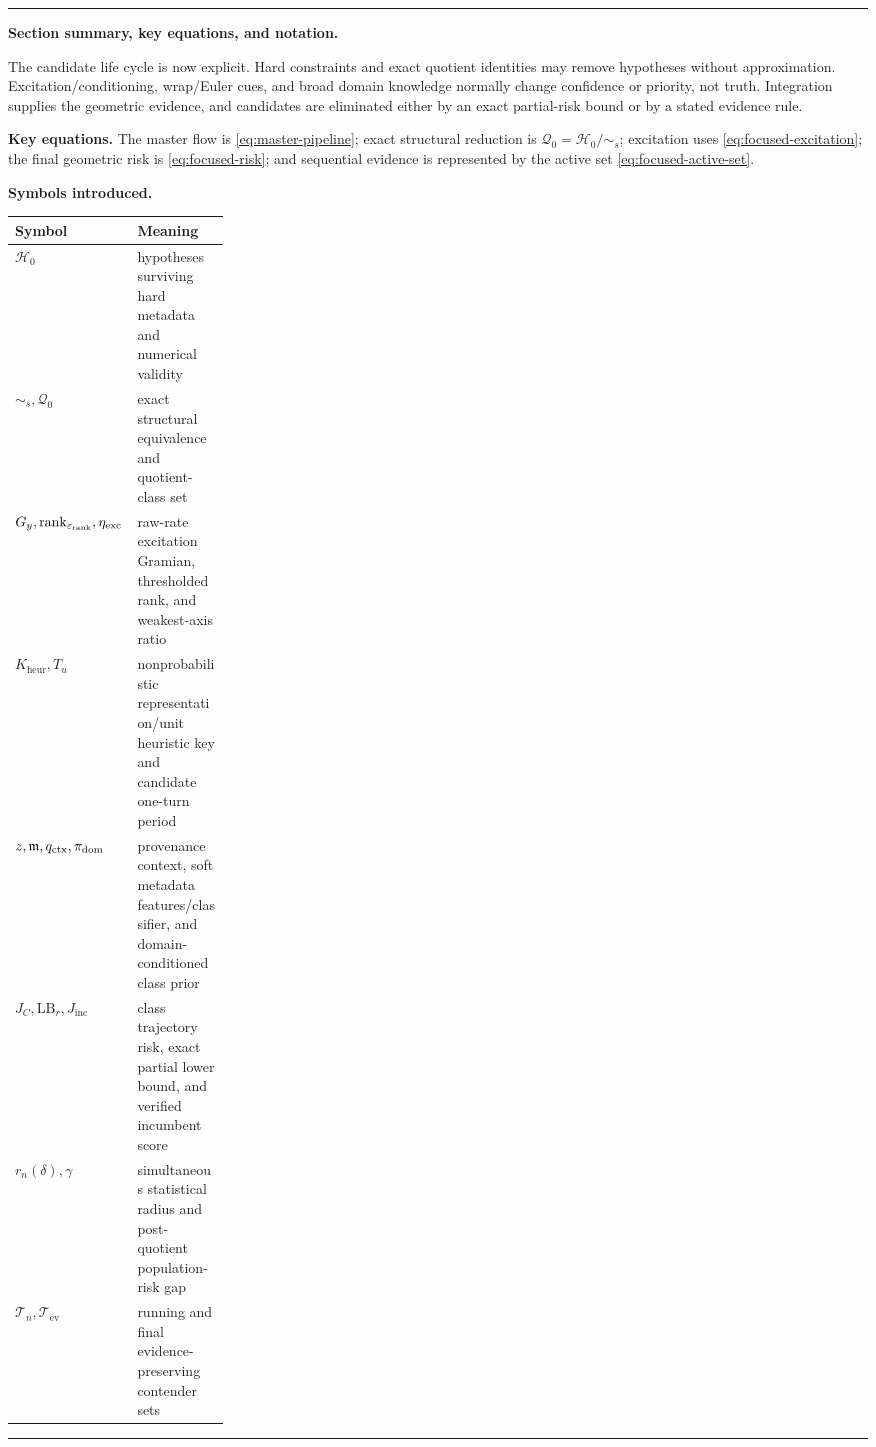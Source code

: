 \documentclass[11pt]{article}
\newenvironment{sectionrecap}
{\par\medskip\begingroup\small\noindent\rule{\linewidth}{0.4pt}\par
\smallskip\noindent\textbf{Section summary, key equations, and notation.}\par\smallskip}
{\par\smallskip\noindent\rule{\linewidth}{0.4pt}\par\endgroup\medskip}
\begin{document}
    \begin{sectionrecap}
        The candidate life cycle is now explicit. Hard constraints and exact quotient identities
        may remove hypotheses without approximation. Excitation/conditioning, wrap/Euler cues, and broad
        domain knowledge normally change confidence or priority, not truth. Integration supplies
        the geometric evidence, and candidates are eliminated either by an exact partial-risk
        bound or by a stated evidence rule.

        \noindent\textbf{Key equations.}
        The master flow is \eqref{eq:master-pipeline}; exact structural reduction is
        $\mathcal Q_0=\mathcal H_0/\!\sim_s$; excitation uses
        \eqref{eq:focused-excitation}; the final geometric risk is \eqref{eq:focused-risk}; and
        sequential evidence is represented by the active set \eqref{eq:focused-active-set}.

        \noindent\textbf{Symbols introduced.}
        \begin{center}
            \small
            \begin{tabularx}{0.97\linewidth}{@{}p{0.25\linewidth}Y@{}}
\toprule
Symbol & Meaning \\
\midrule
$\mathcal H_0$ & hypotheses surviving hard metadata and numerical validity \\
$\sim_s,\mathcal Q_0$ & exact structural equivalence and quotient-class set \\
$G_y,\operatorname{rank}_{\varepsilon_{\rm rank}},\eta_{\rm exc}$ & raw-rate excitation Gramian, thresholded rank, and weakest-axis ratio \\
$K_{\mathrm{heur}},T_u$ & nonprobabilistic representation/unit heuristic key and candidate one-turn period \\
$z,\mathfrak m,q_{\rm ctx},\pi_{\mathrm{dom}}$ & provenance context, soft metadata features/classifier, and domain-conditioned class prior \\
$J_C,\mathrm{LB}_r,J_{\mathrm{inc}}$ & class trajectory risk, exact partial lower bound, and verified incumbent score \\
$r_n(\delta),\gamma$ & simultaneous statistical radius and post-quotient population-risk gap \\
$\mathcal T_n,\mathcal T_{\mathrm{ev}}$ & running and final evidence-preserving contender sets \\
\bottomrule
            \end{tabularx}
        \end{center}
    \end{sectionrecap}
\end{document}
